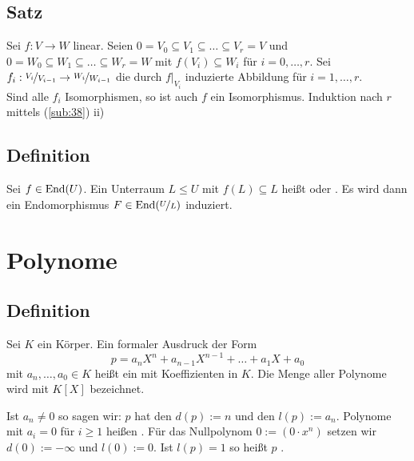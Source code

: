 \subsection[Satz über Herleitung von Isomorphie über die induzierten Abbildungen]{Satz} %
\label{sub:39}
Sei $f : V \to W$ linear. Seien $0= V_0 \subseteq V_1 \subseteq  \ldots \subseteq V_r = V$ und $0=W_0 \subseteq W_1 \subseteq \ldots \subseteq W_r = W$
mit $f(V_i) \subseteq W_i$ für $i=0, \ldots , r$. Sei $f_i : \nicefrac{V_i}{V_{i-1}} \to \nicefrac{W_i}{W_{i-1}}$ die durch $f|_{V_i}$ induzierte Abbildung für 
$i=1, \ldots , r$.\\
Sind alle $f_i$ Isomorphismen, so ist auch $f$ ein Isomorphismus.
Induktion nach $r$ mittels (\ref{sub:38}) ii)

\subsection[Definition von invarianten/stabilen Funktionen]{Definition} %
\label{sub:310}
Sei $f \in \operatorname{End}(U)$. Ein Unterraum $L \le U$ mit $f(L) \subseteq L$ heißt  oder 
. Es wird dann ein Endomorphismus $F \in \operatorname{End}(\nicefrac{U}{L})$ induziert.  
\newpage

\section{Polynome} %
\label{sec:4}

\subsection[Definition Polynom, Leitkoeffizient]{Definition} %
\label{sub:41}
Sei $K$ ein Körper. Ein formaler Ausdruck der Form
\[
	p = a_n X^n + a_{n-1} X^{n-1} + \ldots + a_1 X + a_0
\]
mit $a_n , \ldots , a_0 \in K $ heißt ein  mit Koeffizienten in $K$. Die Menge aller Polynome wird mit $K[X]$ bezeichnet.

Ist $a_n \not= 0$ so sagen wir: $p$ hat den   $d(p):=n$ und den  $l(p):= a_n$. Polynome mit $a_i = 0$ für $i\ge 1$ 
heißen . Für das Nullpolynom $0 :=(0 \cdot x^n)$ setzen wir $d(0):= - \infty$ und $l(0):=0$. Ist $l(p)=1$ so heißt $p$ 
 . 

